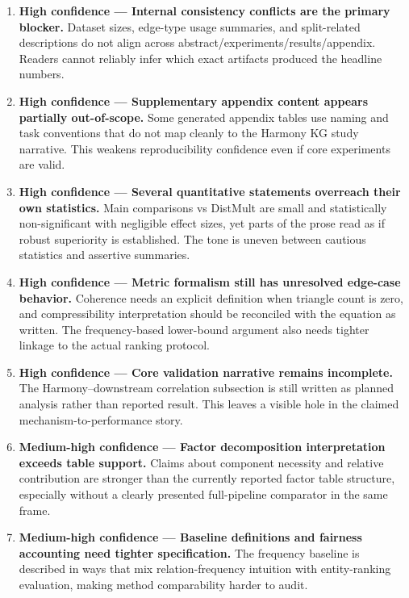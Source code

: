 \documentclass[11pt]{article}
\begin{document}
\begin{enumerate}[leftmargin=*]
  \item \textbf{High confidence --- Internal consistency conflicts are the primary blocker.}
  Dataset sizes, edge-type usage summaries, and split-related descriptions do not align across abstract/experiments/results/appendix. Readers cannot reliably infer which exact artifacts produced the headline numbers.

  \item \textbf{High confidence --- Supplementary appendix content appears partially out-of-scope.}
  Some generated appendix tables use naming and task conventions that do not map cleanly to the Harmony KG study narrative. This weakens reproducibility confidence even if core experiments are valid.

  \item \textbf{High confidence --- Several quantitative statements overreach their own statistics.}
  Main comparisons vs DistMult are small and statistically non-significant with negligible effect sizes, yet parts of the prose read as if robust superiority is established. The tone is uneven between cautious statistics and assertive summaries.

  \item \textbf{High confidence --- Metric formalism still has unresolved edge-case behavior.}
  Coherence needs an explicit definition when triangle count is zero, and compressibility interpretation should be reconciled with the equation as written. The frequency-based lower-bound argument also needs tighter linkage to the actual ranking protocol.

  \item \textbf{High confidence --- Core validation narrative remains incomplete.}
  The Harmony--downstream correlation subsection is still written as planned analysis rather than reported result. This leaves a visible hole in the claimed mechanism-to-performance story.

  \item \textbf{Medium-high confidence --- Factor decomposition interpretation exceeds table support.}
  Claims about component necessity and relative contribution are stronger than the currently reported factor table structure, especially without a clearly presented full-pipeline comparator in the same frame.

  \item \textbf{Medium-high confidence --- Baseline definitions and fairness accounting need tighter specification.}
  The frequency baseline is described in ways that mix relation-frequency intuition with entity-ranking evaluation, making method comparability harder to audit.


\end{enumerate}
\end{document}
